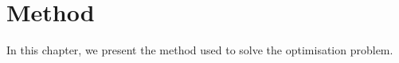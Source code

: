 \chapter{Method}
\label{chap:method}

In this chapter, we present the method used to solve the optimisation problem.


